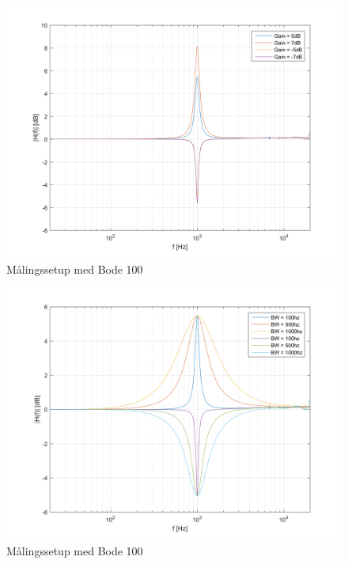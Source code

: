 \begin{figure}[h!]
	\centering
	\includegraphics[scale = 0.8]{billeder/Gain_Med_hotfix}
	\caption{Målingssetup med Bode 100}
	\label{fig:Gain_med_hotfix}
\end{figure}

\begin{figure}[h!]\label{fig:Bandwith_med_hotfix}
	\centering
	\includegraphics[scale = 0.8]{billeder/Bandwidth_Med_hotfix}
	\caption{Målingssetup med Bode 100}
\end{figure}

